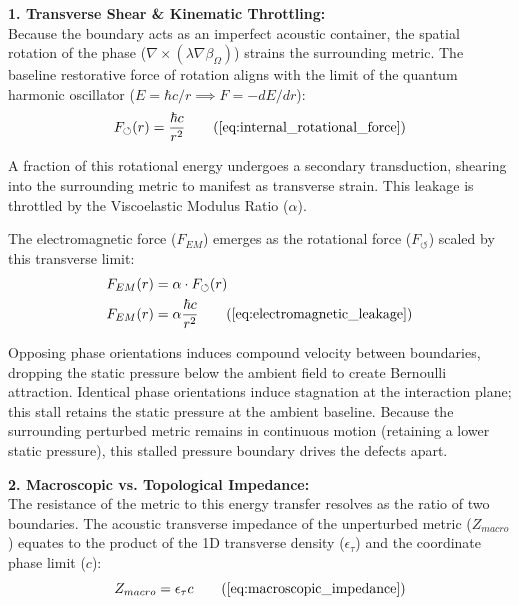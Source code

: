 \vspace{0.2 cm}

\textbf{1. Transverse Shear \& Kinematic Throttling:} \\
Because the boundary acts as an imperfect acoustic container, the spatial rotation of the phase ($\nabla \times (\lambda \nabla \beta_\Omega)$) strains the surrounding metric. The baseline restorative force of rotation aligns with the limit of the quantum harmonic oscillator ($E = \hbar c / r \implies F = -dE/dr$):
\begin{equation}
    F_{\circlearrowleft}(r) = \frac{\hbar c}{r^2} \tag{\ref{eq:internal_rotational_force}}
\end{equation}

A fraction of this rotational energy undergoes a secondary transduction, shearing into the surrounding metric to manifest as transverse strain. This leakage is throttled by the Viscoelastic Modulus Ratio ($\alpha$). 

The electromagnetic force ($F_{EM}$) emerges as the rotational force ($F_{\circlearrowleft}$) scaled by this transverse limit:
\begin{align}
    F_{EM}(r) &= \alpha \cdot F_{\circlearrowleft}(r) \nonumber \\
    F_{EM}(r) &= \alpha \frac{\hbar c}{r^2} \tag{\ref{eq:electromagnetic_leakage}}
\end{align}

Opposing phase orientations induces compound velocity between boundaries, dropping the static pressure below the ambient field to create Bernoulli attraction. Identical phase orientations induce stagnation at the interaction plane; this stall retains the static pressure at the ambient baseline. Because the surrounding perturbed metric remains in continuous motion (retaining a lower static pressure), this stalled pressure boundary drives the defects apart.

\vspace{0.2 cm}


\textbf{2. Macroscopic vs. Topological Impedance:} \\
The resistance of the metric to this energy transfer resolves as the ratio of two boundaries. The acoustic transverse impedance of the unperturbed metric ($Z_{macro}$) equates to the product of the 1D transverse density ($\epsilon_\tau$) and the coordinate phase limit ($c$):
\begin{equation}
    Z_{macro} = \epsilon_{\tau} c \tag{\ref{eq:macroscopic_impedance}}
\end{equation}


